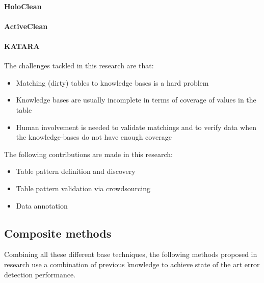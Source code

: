 \paragraph{HoloClean \cite{Rekatsinas2017-iw}}

\paragraph{ActiveClean \cite{Krishnan2016-va}}

\paragraph{KATARA \cite{Chu2015-fs}}
The challenges tackled in this research are that:
\begin{itemize}
    \item Matching (dirty) tables to knowledge bases is a hard problem
    \item Knowledge bases are usually incomplete in terms of coverage of values in the table
    \item Human involvement is needed to validate matchings and to verify data when the knowledge-bases do not have enough coverage
\end{itemize}
The following contributions are made in this research:
\begin{itemize}
    \item Table pattern definition and discovery
    \item Table pattern validation via crowdsourcing
    \item Data annotation
\end{itemize}


\subsection{Composite methods}
Combining all these different base techniques, the following methods proposed in research use a combination of previous knowledge to achieve state of the art error detection performance. 

